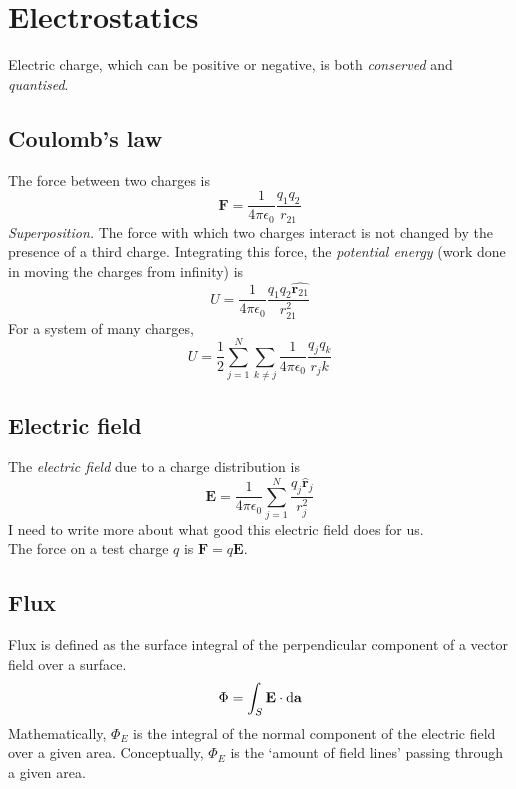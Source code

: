 
\section{Electrostatics}

Electric charge, which can be positive or negative, is both \textit{conserved} and \textit{quantised}.

\subsection*{Coulomb's law}
The force between two charges is
\begin{equation*}
  \mathbf{F} = \frac{1}{4\pi\epsilon_0}\frac{q_1q_2}{r_{21}}
\end{equation*}
\textit{Superposition.} The force with which two charges interact is not changed by the presence of a third charge. 
Integrating this force, the \textit{potential energy} (work done in moving the charges from infinity) is
\begin{equation*}
  U = \frac{1}{4\pi\epsilon_0}\frac{q_1q_2\hat{\mathbf{r}_{21}}}{r^2_{21}}
\end{equation*}
For a system of many charges,
\begin{equation*}
  U = \frac{1}{2}\sum_{j=1}^{N}\sum_{k \neq j}^{} \frac{1}{4\pi\epsilon_0}\frac{q_j q_k}{r_jk}
\end{equation*}
\subsection*{Electric field}
The \textit{electric field} due to a charge distribution is
\begin{equation*}
  \mathbf{E} = \frac{1}{4\pi\epsilon_0} \sum_{j=1}^{N} \frac{q_j\hat{\mathbf{r}}_j}{r^2_j}
\end{equation*}
I need to write more about what good this electric field does for us. \\
The force on a test charge $q$ is $\mathbf{F} = q \mathbf{E}$.
\subsection*{Flux}
Flux is defined as the surface integral of the perpendicular component of a vector field over a surface. 
\begin{equation*}
  \Phi = \int_S \mathbf{E} \cdot \differential \mathbf{a}
\end{equation*}
Mathematically, $\Phi_E$ is the integral of the normal component of the electric field over a given area. 
Conceptually, $\Phi_E$ is the `amount of field lines' passing through a given area.

